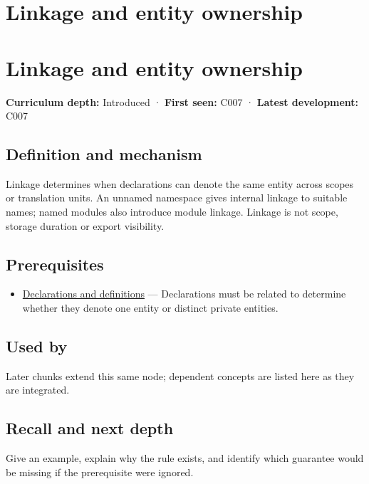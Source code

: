 \hypertarget{appendix-74a0ec818c18}{}
\section*{Linkage and entity ownership}
\section{Linkage and entity ownership}\label{linkage-and-entity-ownership}

\textbf{Curriculum depth:} Introduced · \textbf{First seen:} C007 · \textbf{Latest development:} C007

\subsection{Definition and mechanism}\label{definition-and-mechanism}

Linkage determines when declarations can denote the same entity across scopes or translation units. An unnamed namespace gives internal linkage to suitable names; named modules also introduce module linkage. Linkage is not scope, storage duration or export visibility.

\subsection{Prerequisites}\label{prerequisites}

\begin{itemize}
\tightlist
\item
  \hyperref[appendix-2e4d494c2d94]{Declarations and definitions} --- Declarations must be related to determine whether they denote one entity or distinct private entities.
\end{itemize}

\subsection{Used by}\label{used-by}

Later chunks extend this same node; dependent concepts are listed here as they are integrated.

\subsection{Recall and next depth}\label{recall-and-next-depth}

Give an example, explain why the rule exists, and identify which guarantee would be missing if the prerequisite were ignored.

